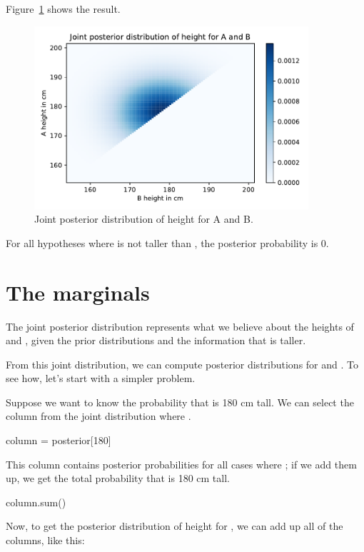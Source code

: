 \documentclass[12pt]{book}
\theoremstyle{exercise}
\begin{document}
Figure~\ref{fig09-03} shows the result.

\begin{figure}
\centerline{\includegraphics[width=4in]{figs/fig09-03.pdf}}
\caption{Joint posterior distribution of height for A and B.}
\label{fig09-03}
\end{figure}

For all hypotheses where  is not taller than , the posterior probability is 0. 


\section{The marginals}

The joint posterior distribution represents what we believe about the heights of  and , given the prior distributions and the information that  is taller.

From this joint distribution, we can compute posterior distributions for  and .  To see how, let's start with a simpler problem.

Suppose we want to know the probability that  is 180 cm tall.  We can select the column from the joint distribution where .

\begin{code}
column = posterior[180]
\end{code}

This column contains posterior probabilities for all cases where ; if we add them up, we get the total probability that  is 180 cm tall.

\begin{code}
column.sum()
\end{code}

Now, to get the posterior distribution of height for , we can add up all of the columns, like this:
\end{document}
